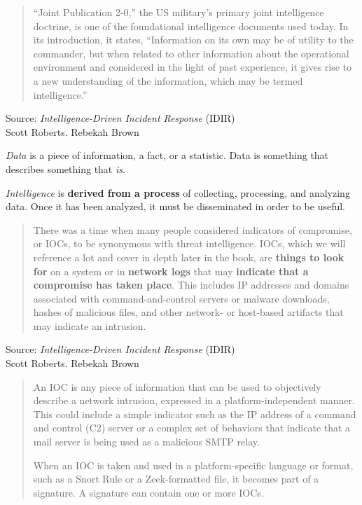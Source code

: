 \documentclass[Screen16to9,17pt]{foils}
\begin{document}


\begin{quote}
“Joint Publication 2-0,” the US military’s primary joint intelligence doctrine, is one of
the foundational intelligence documents used today. In its introduction, it states,
“Information on its own may be of utility to the commander, but when related to
other information about the operational environment and considered in the light of
past experience, it gives rise to a new understanding of the information, which may
be termed intelligence.”
\end{quote}
Source: \emph{Intelligence-Driven Incident Response} (IDIR)\\
 Scott Roberts. Rebekah Brown

\begin{list2}
\item \emph{Data} is a piece of information, a fact, or a statistic. Data is something that describes something that \emph{is}.
\item \emph{Intelligence} is {\bf derived from a process} of collecting, processing, and analyzing data. Once it has been analyzed, it must be disseminated in order to be useful.
\end{list2}


\begin{quote}
There was a time when many people considered indicators of compromise, or IOCs,
to be synonymous with threat intelligence. IOCs, which we will reference a lot and
cover in depth later in the book, are {\bf things to look for} on a system or in {\bf network logs} that may {\bf indicate that a compromise has taken place}. This includes IP addresses and domains associated with command-and-control servers or malware downloads, hashes of malicious files, and other network- or host-based artifacts that may indicate an intrusion.
\end{quote}
Source: \emph{Intelligence-Driven Incident Response} (IDIR)\\
 Scott Roberts. Rebekah Brown




\begin{quote}
An IOC is any piece of information that can be used to objectively describe a
network intrusion, expressed in a platform-independent manner. This could include a simple indicator such as the IP address of a command and control (C2) server or a complex set of behaviors that indicate that a mail server is being used as a malicious SMTP relay.

When an IOC is taken and used in a platform-specific language or format, such as a Snort Rule or a Zeek-formatted file, it becomes part of a signature. A signature can contain one or more IOCs.
\end{quote}
\end{document}
